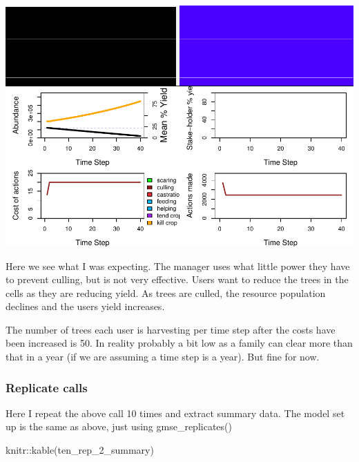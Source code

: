\documentclass[
]{article}
\newenvironment{Shaded}{\begin{snugshade}}{\end{snugshade}}
\newcommand{\DecValTok}[1]{\textcolor[rgb]{0.86,0.86,0.80}{#1}}
\newcommand{\KeywordTok}[1]{\textcolor[rgb]{0.94,0.87,0.69}{#1}}
\newcommand{\NormalTok}[1]{\textcolor[rgb]{0.80,0.80,0.80}{#1}}
\newcommand{\OperatorTok}[1]{\textcolor[rgb]{0.94,0.94,0.82}{#1}}
\begin{document}
\includegraphics{gmse_tenure_ongoing_files/figure-latex/ten_rep_1_plot-1.pdf}

Here we see what I was expecting. The manager uses what little power
they have to prevent culling, but is not very effective. Users want to
reduce the trees in the cells as they are reducing yield. As trees are
culled, the resource population declines and the users yield increases.

The number of trees each user is harvesting per time step after the
costs have been increased is 50. In reality probably a bit low as a
family can clear more than that in a year (if we are assuming a time
step is a year). But fine for now.

\hypertarget{replicate-calls}{%
\subsubsection{Replicate calls}\label{replicate-calls}}

Here I repeat the above call 10 times and extract summary data. The
model set up is the same as above, just using gmse\_replicates()

\begin{Shaded}
\begin{Highlighting}[]
\NormalTok{knitr}\OperatorTok{::}\KeywordTok{kable}\NormalTok{(ten_rep_}\DecValTok{2}\NormalTok{_summary)}
\end{Highlighting}
\end{Shaded}
\end{document}
